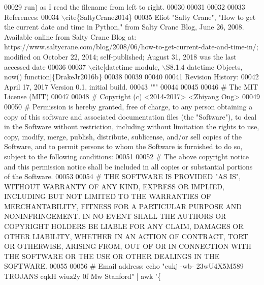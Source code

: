 \begin{DoxyCode}
00029 \textcolor{stringliteral}{        run) as I read the filename from left to right.}
00030 \textcolor{stringliteral}{}
00031 \textcolor{stringliteral}{}
00032 \textcolor{stringliteral}{}
00033 \textcolor{stringliteral}{    References:}
00034 \textcolor{stringliteral}{    \(\backslash\)cite\{SaltyCrane2014\}}
00035 \textcolor{stringliteral}{        Eliot "Salty Crane", "How to get the current date and time in Python," from Salty Crane Blog, June
       26, 2008. Available online from Salty Crane Blog at:
       https://www.saltycrane.com/blog/2008/06/how-to-get-current-date-and-time-in/; modified on October 22, 2014; self-published; August 31, 2018 was the last accessed
       date}
00036 \textcolor{stringliteral}{}
00037 \textcolor{stringliteral}{    \(\backslash\)cite[datetime module, \(\backslash\)S8.1.4 datetime Objects, now() function]\{DrakeJr2016b\}}
00038 \textcolor{stringliteral}{}
00039 \textcolor{stringliteral}{}
00040 \textcolor{stringliteral}{}
00041 \textcolor{stringliteral}{    Revision History:}
00042 \textcolor{stringliteral}{    April 17, 2017          Version 0.1, initial build.}
00043 \textcolor{stringliteral}{"""}
00044 
00045 
00046 \textcolor{comment}{#   The MIT License (MIT)}
00047 
00048 \textcolor{comment}{#   Copyright (c) <2014-2017> <Zhiyang Ong>}
00049 
00050 \textcolor{comment}{#   Permission is hereby granted, free of charge, to any person obtaining a copy of this software and
       associated documentation files (the "Software"), to deal in the Software without restriction, including without
       limitation the rights to use, copy, modify, merge, publish, distribute, sublicense, and/or sell copies of the
       Software, and to permit persons to whom the Software is furnished to do so, subject to the following
       conditions:}
00051 
00052 \textcolor{comment}{#   The above copyright notice and this permission notice shall be included in all copies or substantial
       portions of the Software.}
00053 
00054 \textcolor{comment}{#   THE SOFTWARE IS PROVIDED "AS IS", WITHOUT WARRANTY OF ANY KIND, EXPRESS OR IMPLIED, INCLUDING BUT NOT
       LIMITED TO THE WARRANTIES OF MERCHANTABILITY, FITNESS FOR A PARTICULAR PURPOSE AND NONINFRINGEMENT. IN NO
       EVENT SHALL THE AUTHORS OR COPYRIGHT HOLDERS BE LIABLE FOR ANY CLAIM, DAMAGES OR OTHER LIABILITY, WHETHER IN AN
       ACTION OF CONTRACT, TORT OR OTHERWISE, ARISING FROM, OUT OF OR IN CONNECTION WITH THE SOFTWARE OR THE USE
       OR OTHER DEALINGS IN THE SOFTWARE.}
00055 
00056 \textcolor{comment}{#   Email address: echo "cukj -wb- 23wU4X5M589 TROJANS cqkH wiuz2y 0f Mw Stanford" | awk '\{
}
\end{DoxyCode}
